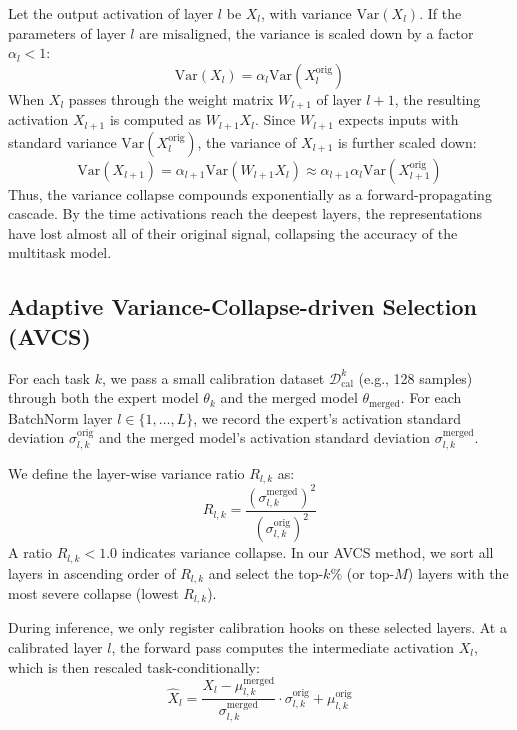 \documentclass{article}
\theoremstyle{plain}
\theoremstyle{definition}
\theoremstyle{remark}
\begin{document}
Let the output activation of layer $l$ be $X_l$, with variance $\text{Var}(X_l)$. If the parameters of layer $l$ are misaligned, the variance is scaled down by a factor $\alpha_l < 1$:
\begin{equation}
\text{Var}(X_l) = \alpha_l \text{Var}(X_l^{\text{orig}})
\end{equation}
When $X_l$ passes through the weight matrix $W_{l+1}$ of layer $l+1$, the resulting activation $X_{l+1}$ is computed as $W_{l+1} X_l$. Since $W_{l+1}$ expects inputs with standard variance $\text{Var}(X_l^{\text{orig}})$, the variance of $X_{l+1}$ is further scaled down:
\begin{equation}
\text{Var}(X_{l+1}) = \alpha_{l+1} \text{Var}(W_{l+1} X_l) \approx \alpha_{l+1} \alpha_l \text{Var}(X_{l+1}^{\text{orig}})
\end{equation}
Thus, the variance collapse compounds exponentially as a forward-propagating cascade. By the time activations reach the deepest layers, the representations have lost almost all of their original signal, collapsing the accuracy of the multitask model.

\subsection{Adaptive Variance-Collapse-driven Selection (AVCS)}
For each task $k$, we pass a small calibration dataset $\mathcal{D}_{\text{cal}}^k$ (e.g., 128 samples) through both the expert model $\theta_k$ and the merged model $\theta_{\text{merged}}$. For each BatchNorm layer $l \in \{1, \dots, L\}$, we record the expert's activation standard deviation $\sigma^{\text{orig}}_{l,k}$ and the merged model's activation standard deviation $\sigma^{\text{merged}}_{l,k}$.

We define the layer-wise variance ratio $R_{l,k}$ as:
\begin{equation}
R_{l,k} = \frac{(\sigma^{\text{merged}}_{l,k})^2}{(\sigma^{\text{orig}}_{l,k})^2}
\end{equation}
A ratio $R_{l,k} < 1.0$ indicates variance collapse. In our AVCS method, we sort all layers in ascending order of $R_{l,k}$ and select the top-$k\%$ (or top-$M$) layers with the most severe collapse (lowest $R_{l,k}$).

During inference, we only register calibration hooks on these selected layers. At a calibrated layer $l$, the forward pass computes the intermediate activation $X_l$, which is then rescaled task-conditionally:
\begin{equation}
\hat{X}_l = \frac{X_l - \mu^{\text{merged}}_{l,k}}{\sigma^{\text{merged}}_{l,k}} \cdot \sigma^{\text{orig}}_{l,k} + \mu^{\text{orig}}_{l,k}
\end{equation}
\end{document}
